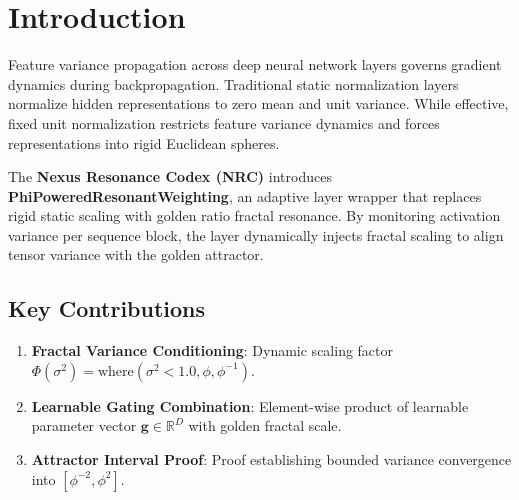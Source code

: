 \section{Introduction}
Feature variance propagation across deep neural network layers governs gradient dynamics during backpropagation. Traditional static normalization layers normalize hidden representations to zero mean and unit variance. While effective, fixed unit normalization restricts feature variance dynamics and forces representations into rigid Euclidean spheres.

The \textbf{Nexus Resonance Codex (NRC)} introduces \textbf{PhiPoweredResonantWeighting}, an adaptive layer wrapper that replaces rigid static scaling with golden ratio fractal resonance. By monitoring activation variance per sequence block, the layer dynamically injects fractal scaling to align tensor variance with the golden attractor.

\subsection{Key Contributions}
\begin{enumerate}[label=\textbf{\arabic*.}]
    \item \textbf{Fractal Variance Conditioning}: Dynamic scaling factor $\Phi(\sigma^2) = \text{where}(\sigma^2 < 1.0, \phi, \phi^{-1})$.
    \item \textbf{Learnable Gating Combination}: Element-wise product of learnable parameter vector $\mathbf{g} \in \mathbb{R}^D$ with golden fractal scale.
    \item \textbf{Attractor Interval Proof}: Proof establishing bounded variance convergence into $[\phi^{-2}, \phi^2]$.
\end{enumerate}